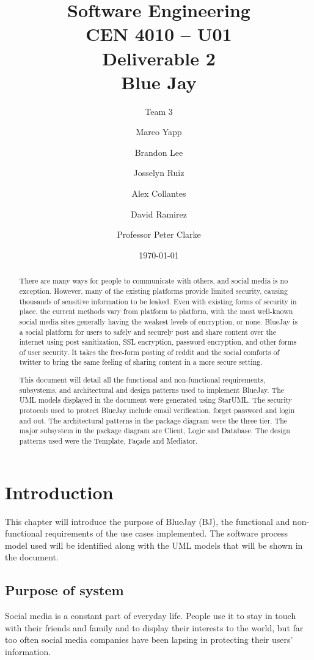 \documentclass{report}
\begin{document}
\title{Software Engineering\\CEN 4010 – U01\\Deliverable 2\\Blue Jay}
\date{\today}
\author{Team 3\and Mareo Yapp\and Brandon Lee\and Josselyn Ruiz\and Alex Collantes\and David Ramirez\and Professor Peter Clarke}
\maketitle

\begin{abstract}
There are many ways for people to communicate with others,
and social media is no exception. However,
many of the existing platforms provide limited security,
causing thousands of sensitive information to be leaked.
Even with existing forms of security in place,
the current methods vary from platform to platform,
with the most well-known social media sites generally having the weakest levels of encryption, or none.
BlueJay is a social platform for users to safely and securely post and share content over the internet using post sanitization,
SSL encryption, password encryption, and other forms of user security.
It takes the free-form posting of reddit and the social comforts of twitter to bring the same feeling of sharing content in a more secure setting.

This document will detail all the functional and non-functional requirements,
subsystems, and architectural and design patterns used to implement BlueJay.
The UML models displayed in the document were generated using StarUML.
The security protocols used to protect BlueJay include email verification,
forget password and login and out.
The architectural patterns in the package diagram were the three tier.
The major subsystem in the package diagram are Client, Logic and Database.
The design patterns used were the Template, Façade and Mediator.
\end{abstract}
 
\tableofcontents

\chapter{Introduction}
	This chapter will introduce the purpose of BlueJay (BJ),
	the functional and non-functional requirements of the use cases implemented.
	The software process model used will be identified along with the UML models that will be shown in the document.
\section{Purpose of system}
	Social media is a constant part of everyday life.
	People use it to stay in touch with their friends and family and to display their interests to the world,
	but far too often social media companies have been lapsing in protecting their users’ information.
\end{document}

